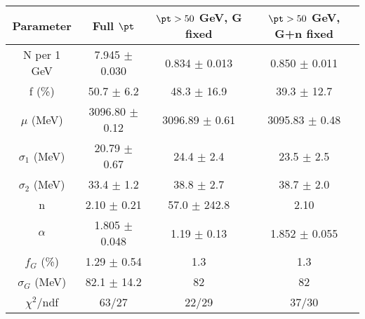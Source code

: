 \begin{tabular}{c||c|c|c}
Parameter & Full $\pt$ & $\pt>50$ GeV, G fixed & $\pt>50$ GeV, G+n fixed \\
\hline
N per 1 GeV & 7.945 $\pm$ 0.030 & 0.834 $\pm$ 0.013 & 0.850 $\pm$ 0.011\\
f (\%) & 50.7 $\pm$ 6.2 & 48.3 $\pm$ 16.9 & 39.3 $\pm$ 12.7\\
$\mu$ (MeV) & 3096.80 $\pm$ 0.12 & 3096.89 $\pm$ 0.61 & 3095.83 $\pm$ 0.48\\
$\sigma_1$ (MeV) & 20.79 $\pm$ 0.67 & 24.4 $\pm$ 2.4 & 23.5 $\pm$ 2.5\\
$\sigma_2$ (MeV) & 33.4 $\pm$ 1.2 & 38.8 $\pm$ 2.7 & 38.7 $\pm$ 2.0\\
n & 2.10 $\pm$ 0.21 & 57.0 $\pm$ 242.8 & 2.10\\
$\alpha$ & 1.805 $\pm$ 0.048 & 1.19 $\pm$ 0.13 & 1.852 $\pm$ 0.055\\
$f_G$ (\%) & 1.29 $\pm$ 0.54 & 1.3 & 1.3\\
$\sigma_G$ (MeV) & 82.1 $\pm$ 14.2 & 82 & 82\\
\hline
$\chi^2$/ndf & 63/27 & 22/29 & 37/30\\
\end{tabular}
